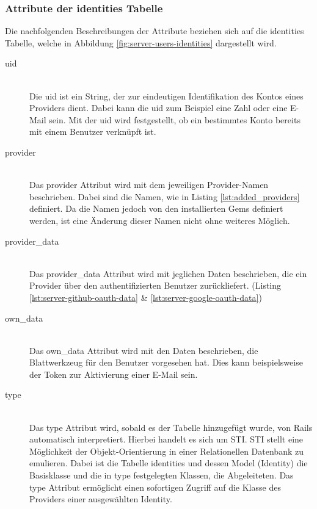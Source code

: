 \subsubsection*{Attribute der identities Tabelle}
Die nachfolgenden Beschreibungen der Attribute beziehen sich auf die identities Tabelle, welche in Abbildung \ref{fig:server-users-identities} dargestellt wird.
\begin{description}
	\item[uid]\hfill\\
	Die uid ist ein String, der zur eindeutigen Identifikation des Kontos eines Providers dient. Dabei kann die uid zum Beispiel eine Zahl oder eine E-Mail sein. Mit der uid wird festgestellt, ob ein bestimmtes Konto bereits mit einem Benutzer verknüpft ist.
	\item[provider]\hfill\\
	Das provider Attribut wird mit dem jeweiligen Provider-Namen beschrieben. Dabei sind die Namen, wie in Listing \ref{lst:added_providers} definiert. Da die Namen jedoch von den installierten Gems definiert werden, ist eine Änderung dieser Namen nicht ohne weiteres Möglich.
	\item[provider\_data]\hfill\\
	Das provider\_data Attribut wird mit jeglichen Daten beschrieben, die ein Provider über den authentifizierten Benutzer zurückliefert. (Listing \ref{lst:server-github-oauth-data} \& \ref{lst:server-google-oauth-data})
	
	\begin{minipage}{.42\textwidth}
		
	\end{minipage}\hfill
	\begin{minipage}{.42\textwidth}
		
	\end{minipage}
	
	\item[own\_data]\hfill\\
	Das own\_data Attribut wird mit den Daten beschrieben, die Blattwerkzeug für den Benutzer vorgesehen hat. Dies kann beispielsweise der Token zur Aktivierung einer E-Mail sein.
	\item[type]\hfill\\
	Das type Attribut wird, sobald es der Tabelle hinzugefügt wurde, von Rails automatisch interpretiert. Hierbei handelt es sich um \gls{STI}. \gls{STI} stellt eine Möglichkeit der Objekt-Orientierung in einer Relationellen Datenbank zu emulieren. Dabei ist die Tabelle identities und dessen Model (Identity) die Basisklasse und die in type festgelegten Klassen, die Abgeleiteten. Das type Attribut ermöglicht einen sofortigen Zugriff auf die Klasse des Providers einer ausgewählten Identity.
\end{description}

